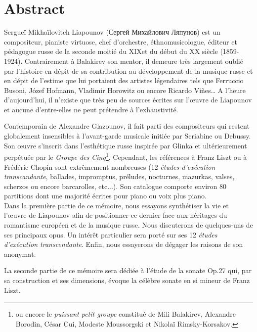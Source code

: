 
\chapter*{Abstract}

Sergueï Mikhaïlovitch Liapounov (\foreignlanguage{russian}{Сергей Михайлович
Ляпунов}) est un compositeur, pianiste virtuose, chef d'orchestre, éthnomusicologue,
éditeur et pédagogue russe de la seconde moitié du XIX\ieme et du début du XX\ieme
siècle (1859-1924). Contrairement à Balakirev son mentor, il demeure très largement
oublié par l'histoire en dépit de sa contribution au développement de la musique
russe et en dépit de l'estime que lui portaient des artistes légendaires tels que
Ferruccio Busoni, Józef Hofmann, Vladimir Horowitz ou encore Ricardo Vi\~{n}es\dots{}
A l'heure d'aujourd'hui, il n'existe que très peu de sources écrites sur l'œuvre de
Liapounov et aucune d'entre-elles ne peut prétendre à l'exhaustivité.

Contemporain de Alexandre Glazounov, il fait parti des compositeurs qui restent
globalement insensibles à l'avant-garde musicale initiée par Scriabine ou Debussy.
Son œuvre s'inscrit dans l’esthétique russe inspirée par Glinka et ultérieurement
perpétuée par le \emph{Groupe des Cinq}\footnote{ou encore le \emph{puissant petit groupe}
constitué de Mili Balakirev, Alexandre Borodin, César Cui, Modeste Moussorgski
et Nikolaï Rimsky-Korsakov.}. Cependant, les références à Franz Liszt ou à Frédéric
Chopin sont extrêmement nombreuses (12 \emph{études d'exécution transcandante},
ballades, impromptus, préludes, nocturnes, mazurkas, valses, scherzos ou encore
barcarolles, etc...). Son catalogue comporte environ 80 partitions dont une
majorité écrites pour piano ou voix plus piano.\\

Dans la première partie de ce mémoire, nous essayons synthétiser la vie et
l'œuvre de Liapounov afin de positionner ce dernier face aux héritages du
romantisme européen et de la musique russe. Nous discuterons de quelques-uns
de ses principaux opus. Un intérêt particulier sera porté sur ses 12
\emph{études d'exécution transcendante}. Enfin, nous essayerons de dégager les
raisons de son anonymat.

La seconde partie de ce mémoire sera dédiée à l'étude de la sonate Op.27 qui,
par sa construction et ses dimensions, évoque la célèbre sonate en si mineur
de Franz Liszt.

